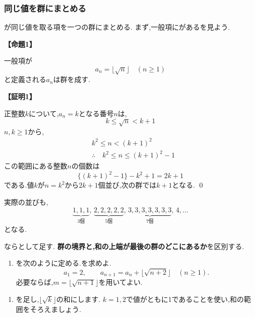 \subsubsection{同じ値を群にまとめる}\label{節：同じ値を群にまとめる}
が同じ値を取る項を一つの群にまとめる.
まず,一般項にがあるを見よう.

\noindent{}\label{証明：ガウス型の群数列}\textbf{【命題1】}\par\nobreak
\begin{smallquote}
  一般項が
  \[
    a_n=\lfloor \sqrt{n} \rfloor\quad(n\ge1)
  \]
  と定義される$a_n$は群を成す.
\end{smallquote}
\noindent \textbf{【証明1】}\par\nobreak
\begin{smallquote}
  正整数$k$について,$a_n=k$となる番号$n$は,
  \[
    k\le\sqrt{n}<k+1
  \]
  $n,k\ge1$から,
  \begin{align*}
    & k^2\le n <(k+1)^2                      \\
    & \therefore\quad k^2\le n \le (k+1)^2-1
  \end{align*}
  この範囲にある整数$n$の個数は
  \[
    \{(k+1)^2-1\}-k^2+1=2k+1
  \]
  である.値$k$が$n=k^2$から$2k+1$個並び,次の群では$k+1$となる. \qed
\end{smallquote}

実際の並びも,
\[
  \underbrace{1,1,1}_{3\text{個}},\,
  \underbrace{2,2,2,2,2}_{5\text{個}},\,
  \underbrace{3,3,3,3,3,3,3}_{7\text{個}},\,4,\ldots
\]
となる.

ならとして足す.
\textbf{群の境界と,和の上端が最後の群のどこにあるか}を区別する.

\noindent {}\par\nobreak
\begin{enumerate}[label=(\arabic*),parsep=3pt,beginpenalty=10000,format=\bookitemlink{example-gauss-role-2}{problem}{answer}]
  \item {}を次のように定める.を求めよ.
    \[
      a_1=2,\qquad
      a_{n+1}=a_n+\lfloor\sqrt{n+2}\rfloor
      \quad(n\ge1).
    \]
    必要ならば,$m=\lfloor\sqrt{n+1}\rfloor$を用いてよい.
\end{enumerate}

\noindent {}\par\nobreak
\begin{enumerate}[label=(\arabic*),parsep=3pt,beginpenalty=10000,format=\bookitemlink{example-gauss-role-2}{hint}{problem}]
  \item {}を足し,$\lfloor\sqrt k\rfloor$の和にします.
    $k=1,2$で値がともに1であることを使い,和の範囲をそろえましょう.
\end{enumerate}

